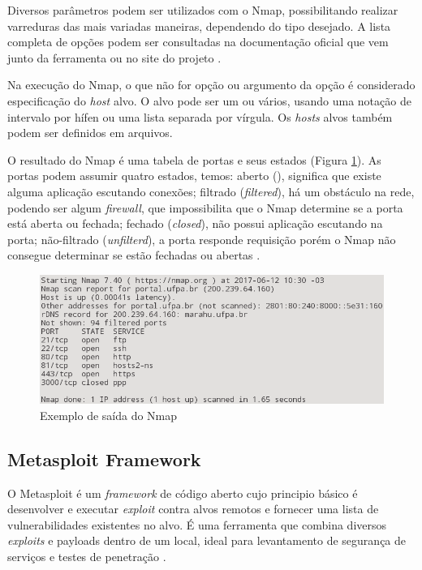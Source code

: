 \documentclass[
	12pt,				
	openright,		
	twoside,	
	a4paper,
	english,	
	brazil	
	]{abntex2}
\begin{document}
 Diversos parâmetros podem ser utilizados com o Nmap, possibilitando realizar varreduras das mais variadas maneiras, dependendo do tipo desejado. A lista completa de opções podem ser consultadas na documentação oficial que vem junto da ferramenta ou no site do projeto \cite{nmap}. 

 Na execução do Nmap, o que não for opção ou argumento da opção é considerado especificação do \textit{host} alvo. O alvo pode ser um ou vários, usando uma notação de intervalo por hífen ou uma lista separada por vírgula. Os \textit{hosts} alvos também podem ser definidos em arquivos.

 O resultado do Nmap é uma tabela de portas e seus estados (Figura \ref{fig:nmap}). As portas podem assumir quatro estados, temos: aberto (), significa que existe alguma aplicação escutando conexões; filtrado (\textit{filtered}), há um obstáculo na rede, podendo ser algum \textit{firewall}, que impossibilita que o Nmap determine se a porta está aberta ou fechada; fechado (\textit{closed}), não possui aplicação escutando na porta; não-filtrado (\textit{unfilterd}), a porta responde requisição porém o Nmap não consegue determinar se estão fechadas ou abertas \cite{nmap}.

 \begin{figure}[!htb]
  \centering
  \includegraphics[scale=.5]{nmap.png}
  \caption{Exemplo de saída do Nmap}
  \label{fig:nmap}
 \end{figure}

 \subsection{Metasploit Framework} \label{sec:metasploit}

 O Metasploit é um \textit{framework} de código aberto cujo principio básico é desenvolver e executar \textit{exploit} contra alvos remotos e fornecer uma lista de vulnerabilidades existentes no alvo. É uma ferramenta que combina diversos \textit{exploits} e payloads dentro de um local, ideal para levantamento de segurança de serviços e testes de penetração \cite{metasploit:yash}.  
\end{document}
